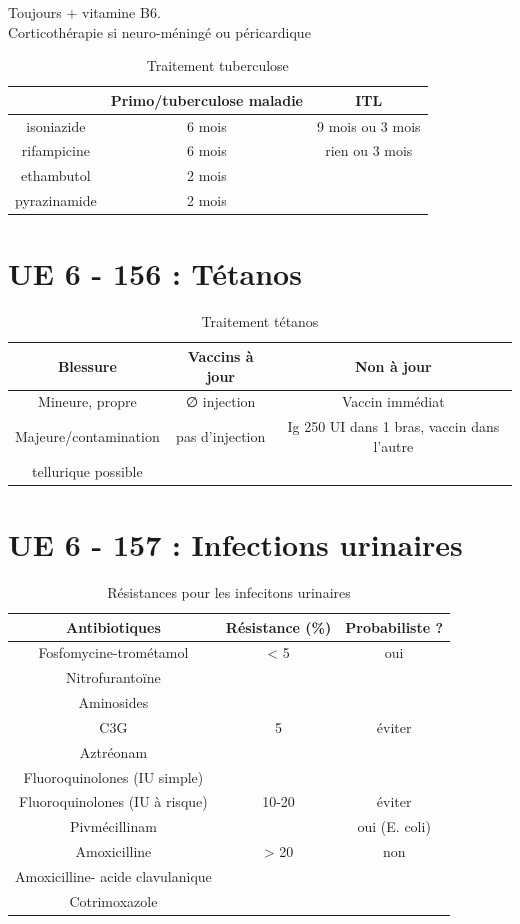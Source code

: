 \documentclass{article}
\begin{document}
Toujours + vitamine B6.\\
Corticothérapie si neuro-méningé ou péricardique

\begin{table}[htpb]
  \centering
  \caption{Traitement tuberculose}
  \begin{tabular}{*{3}{c}}
    \toprule
    & Primo/tuberculose maladie & ITL \\
    \midrule
 isoniazide & 6 mois & 9 mois ou 3 mois\\
 rifampicine & 6 mois & rien ou 3 mois \\
 ethambutol & 2 mois &\\
 pyrazinamide & 2 mois\\
 \bottomrule
  \end{tabular}
\end{table}
\section{UE 6 - 156 : Tétanos}
\begin{table}[htpb]
  \centering
  \caption{Traitement tétanos}
  \begin{tabular}{ccc}
    \toprule
    Blessure& Vaccins à jour& Non à jour\\
    \midrule
    Mineure, propre& ∅ injection& Vaccin immédiat\\
    Majeure/contamination& pas d'injection& Ig 250 UI dans 1
    bras, vaccin dans l'autre\\
    tellurique possible&&\\
    \bottomrule
  \end{tabular}
\end{table}

\section{UE 6 - 157 : Infections urinaires}%
\label{sec:item_157_infections_urinaires}

\begin{table}[htpb]
  \centering
  \caption{Résistances pour les infecitons urinaires}
  \begin{tabular}{ccc}
    \toprule
    Antibiotiques & Résistance (\%) & Probabiliste ? \\
    \midrule
    Fosfomycine-trométamol & < 5 & oui \\
    Nitrofurantoïne & &\\
    Aminosides & &\\
    \midrule
    C3G & 5 & éviter \\
    Aztréonam&&\\
    Fluoroquinolones (IU simple)&&\\
    \midrule
    Fluoroquinolones (IU à risque)& 10-20& éviter\\
    Pivmécillinam & & oui (E. coli) \\
    \midrule
    Amoxicilline & > 20 & non\\
    Amoxicilline- acide clavulanique &\\
    Cotrimoxazole &\\
    \bottomrule
  \end{tabular}
\end{table}
\end{document}
